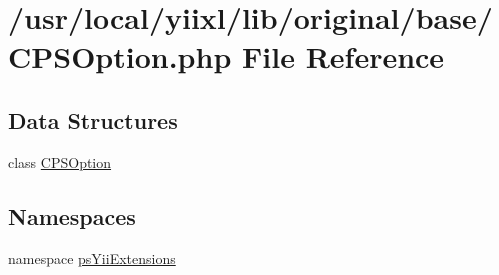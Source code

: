 \hypertarget{CPSOption_8php}{
\section{/usr/local/yiixl/lib/original/base/CPSOption.php File Reference}
\label{CPSOption_8php}
}
\subsection*{Data Structures}
\begin{DoxyCompactItemize}
\item 
class \hyperlink{classCPSOption}{CPSOption}
\end{DoxyCompactItemize}
\subsection*{Namespaces}
\begin{DoxyCompactItemize}
\item 
namespace \hyperlink{namespacepsYiiExtensions}{psYiiExtensions}
\end{DoxyCompactItemize}
